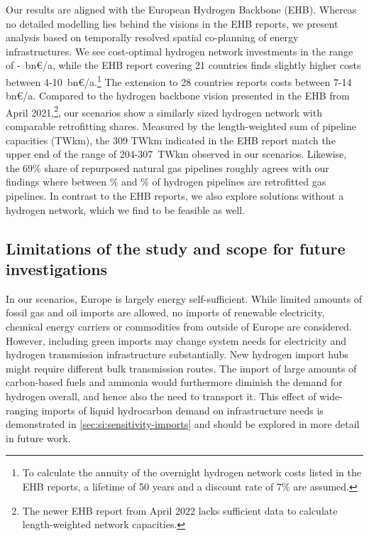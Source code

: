 Our results are aligned with the European Hydrogen Backbone
(EHB).\cite{gasforclimateEuropeanHydrogen2020,gasforclimateExtendingEuropean2021,gasforclimateEuropeanHydrogen2021,gasforclimateEuropeanHydrogen2022}
Whereas no detailed modelling lies behind the visions in the EHB reports, we
present analysis based on temporally resolved spatial co-planning of energy
infrastructures. We see cost-optimal hydrogen network investments in the range
of \minhycost-\maxhycost~bn\euro/a, while the EHB report covering 21 countries
finds slightly higher costs between
4-10~bn\euro/a.\cite{gasforclimateExtendingEuropean2021}\footnote{To calculate
the annuity of the overnight hydrogen network costs listed in the EHB reports, a
lifetime of 50 years and a discount rate of 7\% are assumed.} The extension to
28 countries reports costs between 7-14
bn\euro/a.\cite{gasforclimateEuropeanHydrogen2022} Compared to the hydrogen
backbone vision presented in the EHB from April
2021,\cite{gasforclimateExtendingEuropean2021}\footnote{The newer EHB report
from April 2022 \cite{gasforclimateEuropeanHydrogen2022} lacks sufficient data
to calculate length-weighted network capacities.}, our scenarios show a
similarly sized hydrogen network with comparable retrofitting shares. Measured
by the length-weighted sum of pipeline capacities (TWkm), the 309 TWkm indicated
in the EHB report match the upper end of the range of 204-307~TWkm observed in
our scenarios. Likewise, the 69\% share of repurposed natural gas pipelines
\cite{gasforclimateExtendingEuropean2021} roughly agrees with our findings where
between \minretroshare\% and \maxretroshare\% of hydrogen pipelines are
retrofitted gas pipelines. In contrast to the EHB reports, we also explore
solutions without a hydrogen network, which we find to be feasible as well.

\subsection*{Limitations of the study and scope for future investigations}
\label{sec:limitations}

In our scenarios, Europe is largely energy self-sufficient. While limited
amounts of fossil gas and oil imports are allowed, no imports of renewable
electricity, chemical energy carriers or commodities from outside of Europe are
considered. However, including green imports may change system needs for
electricity and hydrogen transmission infrastructure substantially. New hydrogen
import hubs might require different bulk transmission routes. The import of
large amounts of carbon-based fuels and ammonia would furthermore diminish the
demand for hydrogen overall, and hence also the need to transport it. This
effect of wide-ranging imports of liquid hydrocarbon demand on infrastructure
needs is demonstrated in \cref{sec:si:sensitivity-imports} and should be
explored in more detail in future work.
\cite{fasihiTechnoeconomicAssessment2019,heuserTechnoeconomicAnalysis2019,hamppImportOptions2023}

